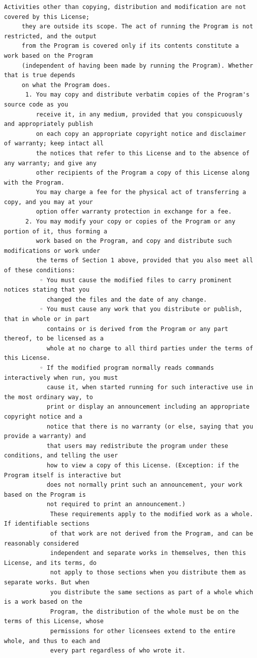\begin{lstlisting}[basicstyle=\ttfamily\footnotesize,breaklines=true]
     Activities other than copying, distribution and modification are not covered by this License;
     they are outside its scope. The act of running the Program is not restricted, and the output
     from the Program is covered only if its contents constitute a work based on the Program
     (independent of having been made by running the Program). Whether that is true depends
     on what the Program does.
      1. You may copy and distribute verbatim copies of the Program's source code as you
         receive it, in any medium, provided that you conspicuously and appropriately publish
         on each copy an appropriate copyright notice and disclaimer of warranty; keep intact all
         the notices that refer to this License and to the absence of any warranty; and give any
         other recipients of the Program a copy of this License along with the Program.
         You may charge a fee for the physical act of transferring a copy, and you may at your
         option offer warranty protection in exchange for a fee.
      2. You may modify your copy or copies of the Program or any portion of it, thus forming a
         work based on the Program, and copy and distribute such modifications or work under
         the terms of Section 1 above, provided that you also meet all of these conditions:
          ◦ You must cause the modified files to carry prominent notices stating that you
            changed the files and the date of any change.
          ◦ You must cause any work that you distribute or publish, that in whole or in part
            contains or is derived from the Program or any part thereof, to be licensed as a
            whole at no charge to all third parties under the terms of this License.
          ◦ If the modified program normally reads commands interactively when run, you must
            cause it, when started running for such interactive use in the most ordinary way, to
            print or display an announcement including an appropriate copyright notice and a
            notice that there is no warranty (or else, saying that you provide a warranty) and
            that users may redistribute the program under these conditions, and telling the user
            how to view a copy of this License. (Exception: if the Program itself is interactive but
            does not normally print such an announcement, your work based on the Program is
            not required to print an announcement.)
             These requirements apply to the modified work as a whole. If identifiable sections
             of that work are not derived from the Program, and can be reasonably considered
             independent and separate works in themselves, then this License, and its terms, do
             not apply to those sections when you distribute them as separate works. But when
             you distribute the same sections as part of a whole which is a work based on the
             Program, the distribution of the whole must be on the terms of this License, whose
             permissions for other licensees extend to the entire whole, and thus to each and
             every part regardless of who wrote it.





\end{lstlisting}
